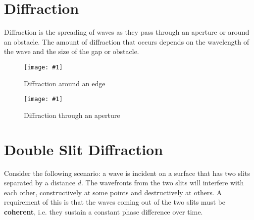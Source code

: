 \documentclass[a4paper,12pt]{article}
\let\oldsection\section
\renewcommand\section{\clearpage\oldsection}
\newcommand{\img}[4]{\begin{center}
  \begin{figure}[H]
    \centering
    \texttt{[image: \#1]}
    \caption{#3}
    \label{fig:#4}
  \end{figure}
\end{center}}
\begin{document}
\section{Diffraction}

Diffraction is the spreading of waves as they pass through an aperture or around an obstacle. The amount of diffraction that occurs depends on the wavelength of the wave and the size of the gap or obstacle.

\begin{minipage}{0.45\textwidth}
  \img{diffractionedge.png}{1}{Diffraction around an edge}{diffraction}
\end{minipage}\hspace*{0.1\textwidth}%
\begin{minipage}{0.45\textwidth}
  \img{diffractionaperture.png}{1}{Diffraction through an aperture}{diffractionaperture}
\end{minipage}


\pagebreak

\section{Double Slit Diffraction}

Consider the following scenario: a wave is incident on a surface that has two slits separated by a distance $d$. The wavefronts from the two slits will interfere with each other, constructively at some points and destructively at others. A requirement of this is that the waves coming out of the two slits must be \textbf{coherent}, i.e. they sustain a constant phase difference over time.
\end{document}
